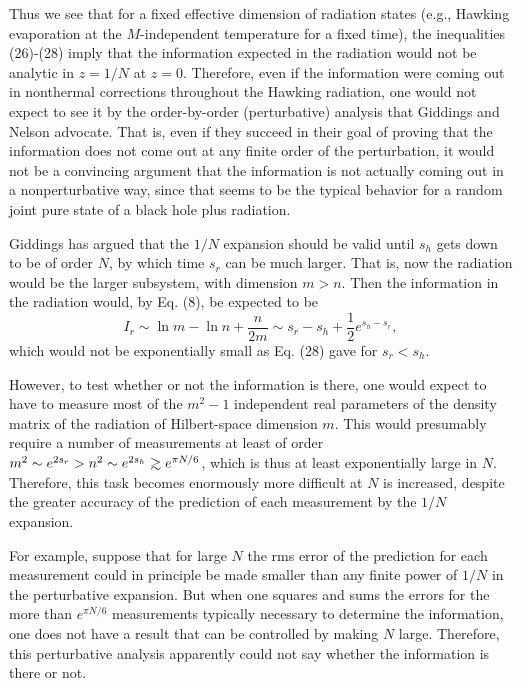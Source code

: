 \documentclass[12pt]{article}
\begin{document}
	Thus we see that for a fixed effective dimension
of radiation states (e.g., Hawking evaporation at the
$M$-independent temperature for a fixed time),
the inequalities (26)-(28) imply that the information
expected in the radiation would not be analytic in
$z=1/N$ at $z=0$.  Therefore, even if the information
were coming out in nonthermal corrections throughout
the Hawking radiation, one would not expect to see it
by the order-by-order (perturbative) analysis that
Giddings and Nelson advocate.  That is, even if they
succeed in their goal of proving that the information
does not come out at any finite order of the perturbation,
it would not be a convincing argument that the information
is not actually coming out in a nonperturbative way,
since that seems to be the typical behavior for
a random joint pure state of a black hole plus radiation.

	Giddings has argued \cite{Gidpri} that the $1/N$
expansion should be valid until $s_h$ gets down to be
of order $N$, by which time $s_r$ can be much larger.
That is, now the radiation would be the larger subsystem,
with dimension $m>n$. Then the information in the
radiation would, by Eq. (8), be expected to be
	\begin{equation}
	I_r\sim\ln m - \ln n + \frac{n}{2m}\sim
	s_r - s_h + \frac{1}{2}e^{s_h-s_r},
	\end{equation}
which would not be exponentially small as Eq. (28) gave
for $s_r<s_h$.

	However, to test whether or not the information is there,
one would expect to have to measure most of the $m^2-1$
independent real parameters of the density matrix of the
radiation of Hilbert-space dimension $m$.  This would
presumably require a number of measurements at least of
order $m^2\sim e^{2s_r}>n^2\sim e^{2s_h}
{\;\raise.3ex\hbox{$>$\kern-.75em\lower1ex\hbox{$\sim$}}\;}
e^{\pi N/6}$,
which is thus at least exponentially large in $N$.
Therefore, this task becomes enormously more difficult
at $N$ is increased, despite the greater accuracy of the
prediction of each measurement by the $1/N$ expansion.

	For example, suppose that for large $N$ the rms
error of the prediction for each measurement could in
principle be made smaller than any finite power of $1/N$
in the perturbative expansion.  But when one squares
and sums the errors for the more than $e^{\pi N/6}$
measurements typically necessary to determine the
information, one does not have a result that can be
controlled by making $N$ large.  Therefore, this
perturbative analysis apparently could not say
whether the information is there or not.
\end{document}
